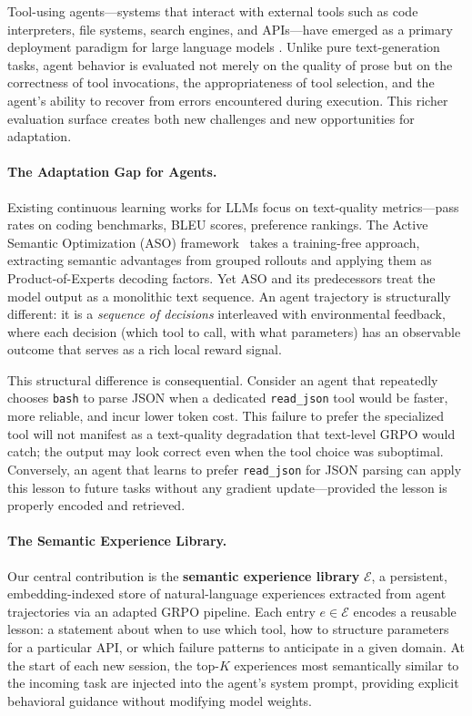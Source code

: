\documentclass[11pt]{article}
\begin{document}
Tool-using agents---systems that interact with external tools such as code
interpreters, file systems, search engines, and APIs---have emerged as a
primary deployment paradigm for large language models
\cite{schick2023toolformer, yang2024intercode, yao2023react}. Unlike pure
text-generation tasks, agent behavior is evaluated not merely on the quality of
prose but on the correctness of tool invocations, the appropriateness of tool
selection, and the agent's ability to recover from errors encountered during
execution. This richer evaluation surface creates both new challenges and new
opportunities for adaptation.

\paragraph{The Adaptation Gap for Agents.}
Existing continuous learning works for LLMs focus on text-quality
metrics---pass rates on coding benchmarks, BLEU scores, preference rankings.
The Active Semantic Optimization (ASO) framework~\cite{hanzo2026aso} takes a
training-free approach, extracting semantic advantages from grouped rollouts and
applying them as Product-of-Experts decoding factors. Yet ASO and its
predecessors treat the model output as a monolithic text sequence. An agent
trajectory is structurally different: it is a \emph{sequence of decisions}
interleaved with environmental feedback, where each decision (which tool to
call, with what parameters) has an observable outcome that serves as a rich
local reward signal.

This structural difference is consequential. Consider an agent that repeatedly
chooses \texttt{bash} to parse JSON when a dedicated \texttt{read\_json} tool
would be faster, more reliable, and incur lower token cost. This failure to
prefer the specialized tool will not manifest as a text-quality degradation
that text-level GRPO would catch; the output may look correct even when the
tool choice was suboptimal. Conversely, an agent that learns to prefer
\texttt{read\_json} for JSON parsing can apply this lesson to future tasks
without any gradient update---provided the lesson is properly encoded and
retrieved.

\paragraph{The Semantic Experience Library.}
Our central contribution is the \textbf{semantic experience library}
$\mathcal{E}$, a persistent, embedding-indexed store of natural-language
experiences extracted from agent trajectories via an adapted GRPO pipeline.
Each entry $e \in \mathcal{E}$ encodes a reusable lesson: a statement about
when to use which tool, how to structure parameters for a particular API, or
which failure patterns to anticipate in a given domain. At the start of each
new session, the top-$K$ experiences most semantically similar to the incoming
task are injected into the agent's system prompt, providing explicit behavioral
guidance without modifying model weights.
\end{document}
